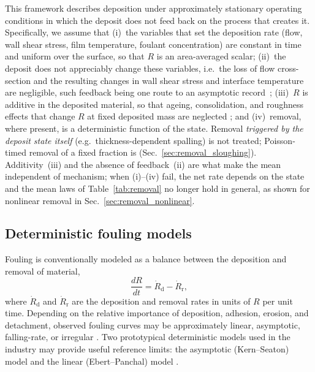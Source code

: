 \documentclass[preprint,12pt]{elsarticle}
\begin{document}
This framework describes deposition under approximately stationary operating
conditions in which the deposit does not feed back on the process that creates
it. Specifically, we assume that (i)~the variables that set the deposition rate
(flow, wall shear stress, film temperature, foulant concentration) are constant
in time and uniform over the surface, so that $R$ is an area-averaged scalar;
(ii)~the deposit does not appreciably change these variables, i.e.\ the loss of
flow cross-section and the resulting changes in wall shear stress and interface
temperature are negligible, such feedback being one route to an
asymptotic record~\cite{Rehman2023}; (iii)~$R$ is additive in the deposited material, so
that ageing, consolidation, and roughness effects that change $R$ at fixed
deposited mass are neglected \cite{Crittenden1988,Ishiyama2011}; and (iv)~removal, where present, is a
deterministic function of the state.
Removal \emph{triggered by the deposit state itself} (e.g.\ thickness-dependent
spalling) is not treated; Poisson-timed removal of a fixed fraction
is (Sec.~\ref{sec:removal_sloughing}). 
Additivity~(iii) and the absence of feedback~(ii) are what make the mean
independent of mechanism; when (i)--(iv) fail, the net rate depends on the
state and the mean laws of Table~\ref{tab:removal} no longer hold in general,
as shown for nonlinear removal in Sec.~\ref{sec:removal_nonlinear}.

\subsection{Deterministic fouling models}
\label{sec:deterministic_models}

Fouling is conventionally modeled as a balance between the deposition and
removal of material,
\begin{equation}
  \frac{dR}{dt}=\dot R_{\mathrm d}-\dot R_{\mathrm r},
  \label{eq:deterministic_mass_balance}
\end{equation}
where $\dot R_{\mathrm d}$ and $\dot R_{\mathrm r}$ are the deposition and
removal rates in units of $R$ per unit time. Depending on the relative
importance of deposition, adhesion, erosion, and detachment, observed
fouling curves may be approximately linear, asymptotic, falling-rate, or irregular 
\cite{Bott1995, AugustinMeloWilson2025}. 
Two prototypical 
deterministic models used in the industry may 
provide useful reference limits: the asymptotic
(Kern--Seaton) model \cite{KernSeaton1959} 
and the linear (Ebert--Panchal) model
\cite{EbertPanchal1997}.
\end{document}

